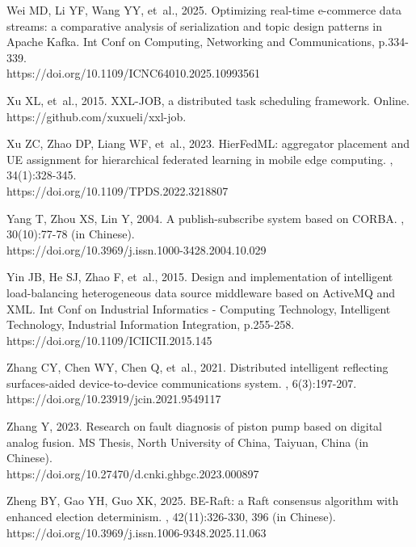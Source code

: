 \documentclass[twoside,twocolumn]{article}
\begin{document}
\begin{thebibliography}{}
Wei MD, Li YF, Wang YY, {et~al.}, 2025.
\newblock Optimizing real-time e-commerce data streams: a comparative analysis of serialization and topic design patterns in Apache Kafka.
\newblock Int Conf on Computing, Networking and Communications, p.334-339. \\
https://doi.org/10.1109/ICNC64010.2025.10993561


Xu XL, {et~al.}, 2015.
\newblock XXL-JOB, a distributed task scheduling framework.
\newblock Online. https://github.com/xuxueli/xxl-job.


Xu ZC, Zhao DP, Liang WF, {et~al.}, 2023.
\newblock HierFedML: aggregator placement and UE assignment for hierarchical federated learning in mobile edge computing.
, 34(1):328-345. \\
https://doi.org/10.1109/TPDS.2022.3218807


Yang T, Zhou XS, Lin Y, 2004.
\newblock A publish-subscribe system based on CORBA.
, 30(10):77-78 (in Chinese). \\
https://doi.org/10.3969/j.issn.1000-3428.2004.10.029


Yin JB, He SJ, Zhao F, {et~al.}, 2015.
\newblock Design and implementation of intelligent load-balancing heterogeneous data source middleware based on ActiveMQ and XML.
\newblock Int Conf on Industrial Informatics - Computing Technology, Intelligent Technology, Industrial Information Integration, p.255-258. \\
https://doi.org/10.1109/ICIICII.2015.145


Zhang CY, Chen WY, Chen Q, {et~al.}, 2021.
\newblock Distributed intelligent reflecting surfaces-aided device-to-device communications system.
, 6(3):197-207. \\
https://doi.org/10.23919/jcin.2021.9549117


Zhang Y, 2023.
\newblock Research on fault diagnosis of piston pump based on digital analog fusion.
\newblock MS Thesis, North University of China, Taiyuan, China (in Chinese). \\
https://doi.org/10.27470/d.cnki.ghbgc.2023.000897


Zheng BY, Gao YH, Guo XK, 2025.
\newblock BE-Raft: a Raft consensus algorithm with enhanced election determinism.
, 42(11):326-330, 396 (in Chinese). \\
https://doi.org/10.3969/j.issn.1006-9348.2025.11.063
\end{thebibliography}
\end{document}
